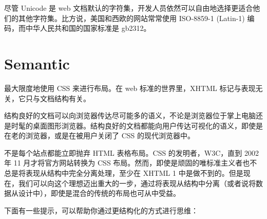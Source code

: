 尽管 Unicode 是 web 文档默认的字符集，开发人员依然可以自由地选择更适合他们的其他字符集。比方说，美国和西欧的网站常常使用 ISO-8859-1 (Latin-1) 编码，而中华人民共和国的国家标准是 gb2312。


\section{Semantic}


最大限度地使用 CSS 来进行布局。在 web 标准的世界里，XHTML 标记与表现无关，它只与文档结构有关。

结构良好的文档可以向浏览器传达尽可能多的语义，不论是浏览器位于掌上电脑还是时髦的桌面图形浏览器。结构良好的文档都能向用户传达可视化的语义，即使是在老的浏览器，或是在被用户关闭了 CSS 的现代浏览器中。

不是每个站点都能立即抛弃 HTML 表格布局。CSS 的发明者，W3C，直到 2002 年 11 月才将官方网站转换为 CSS 布局。然而，即使是顽固的唯标准主义者也不总是将表现从结构中完全分离处理，至少在 XHTML 1 中是做不到的。但是现在，我们可以向这个理想迈出重大的一步，通过将表现从结构中分离（或者说将数据从设计中），即使是混合的传统的布局也可从中受益。

下面有一些提示，可以帮助你通过更结构化的方式进行思维：

